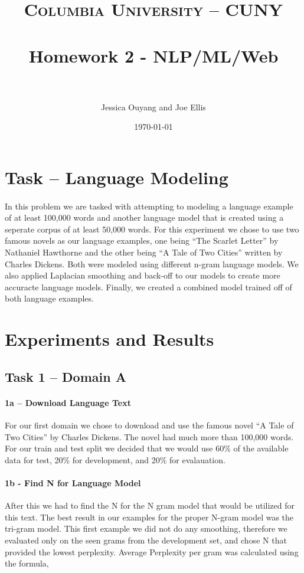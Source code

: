 \documentclass[paper=a4, fontsize=11pt]{scrartcl} %
\title{	
\normalfont \normalsize 
\textsc{Columbia University -- CUNY} \\ [25pt] %
\horrule{0.5pt} \\[0.4cm] %
\huge Homework 2 - NLP/ML/Web \\ %
\horrule{2pt} \\[0.5cm] %
}
\author{Jessica Ouyang and Joe Ellis} %
\date{\normalsize\today} %
\begin{document}
\maketitle %


\section{Task -- Language Modeling}
\paragraph{}
In this problem we are tasked with attempting to modeling a language example of at least 100,000 words and another language model that is created using a seperate corpus of at least 50,000 words.  For this experiment we chose to use two famous novels as our language examples, one being ``The Scarlet Letter'' by Nathaniel Hawthorne and the other being ``A Tale of Two Cities'' written by Charles Dickens.  Both were modeled using different n-gram language models.  We also applied Laplacian smoothing and back-off to our models to create more accuracte language models.  Finally, we created a combined model trained off of both language examples.

\section{Experiments and Results}
\subsection{Task 1 -- Domain A}


\paragraph{1a -- Download Language Text}
For our first domain we chose to download and use the famous novel ``A Tale of Two Cities'' by Charles Dickens.  The novel had much more than 100,000 words.  For our train and test split we decided that we would use 60\% of the available data for test, 20\% for development, and 20\% for evalauation.

\paragraph{1b - Find N for Language Model}
After this we had to find the N for the N gram model that would be utilized for this text.  The best result in our examples for the proper N-gram model was the tri-gram model.  This first example we did not do any smoothing, therefore we evaluated only on the seen grams from the development set, and chose N that provided the lowest perplexity.  Average Perplexity per gram was calculated using the formula,
\end{document}
